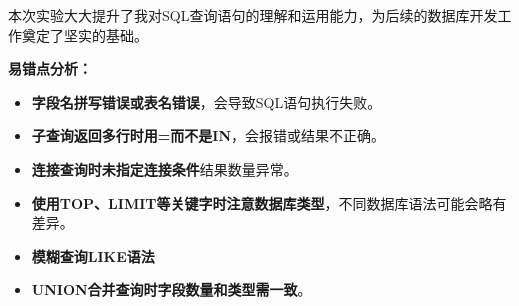 \documentclass[a4paper]{article}
\begin{document}
本次实验大大提升了我对SQL查询语句的理解和运用能力，为后续的数据库开发工作奠定了坚实的基础。

\textbf{易错点分析：}
\begin{itemize}
    \item \textbf{字段名拼写错误或表名错误}，会导致SQL语句执行失败。
    \item \textbf{子查询返回多行时用=而不是IN}，会报错或结果不正确。
    \item \textbf{连接查询时未指定连接条件}结果数量异常。
    \item \textbf{使用TOP、LIMIT等关键字时注意数据库类型}，不同数据库语法可能会略有差异。
    \item \textbf{模糊查询LIKE语法}
    \item \textbf{UNION合并查询时字段数量和类型需一致}。
\end{itemize}
\end{document}
